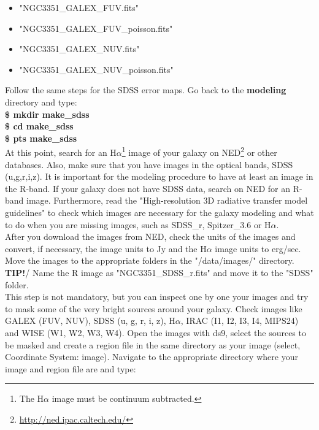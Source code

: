 \documentclass[15pt,a4paper,oneside,openright]{report}
\begin{document}
\begin{itemize}
	\item "NGC3351\_GALEX\_FUV.fits"
	\item "NGC3351\_GALEX\_FUV\_poisson.fits"
	\item "NGC3351\_GALEX\_NUV.fits"
	\item "NGC3351\_GALEX\_NUV\_poisson.fits"
\end{itemize}

Follow the same steps for the SDSS error maps. Go back to the \textbf{modeling} directory and type:\\

\textbf{\$ mkdir make\_sdss}\\

\textbf{\$ cd make\_sdss}\\

\textbf{\$ pts make\_sdss}\\

At this point, search for an H${\alpha}$\footnote{The H${\alpha}$ image must be continuum subtracted.} image of your galaxy on NED\footnote{\href{http://ned.ipac.caltech.edu/}{http://ned.ipac.caltech.edu/}} or other databases. Also, make sure that you have images in the optical bands, SDSS (u,g,r,i,z). 
It is important for the modeling procedure to have at least an image in the R-band. If your galaxy does not have SDSS data, search on NED for an R-band 
image. Furthermore, read the "High-resolution 3D radiative transfer model guidelines" to check which images are necessary for the galaxy modeling and 
what to do when you are missing images, such as SDSS\_r, Spitzer\_3.6 or H${\alpha}$.\\

After you download the images from NED, check the units of the images and convert, if necessary, the image units to Jy and the H${\alpha}$ image units to erg/sec. Move the images to the appropriate folders in the "/data/images/" directory.\\

\textbf{TIP!}/ Name the R image as "NGC3351\_SDSS\_r.fits" and move it to the "SDSS" folder.\\

This step is not mandatory, but you can inspect one by one your images and try to mask some of the very bright sources around your galaxy. Check images 
like GALEX (FUV, NUV), SDSS (u, g, r, i, z), H$\alpha$, IRAC (I1, I2, I3, I4, MIPS24) and WISE (W1, W2, W3, W4). 
Open the images with ds9, select the sources to be masked and create a region file in the same directory as your image (select, Coordinate System: image). 
Navigate to the appropriate directory where your image and region file are and type:\\
\end{document}
